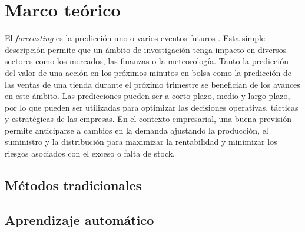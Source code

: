 \chapter{Marco teórico}\label{cap2}

El \textit{forecasting} es la predicción uno o varios eventos futuros \cite{intro}. Esta simple descripción permite que un ámbito de investigación tenga impacto en diversos sectores como los mercados, las finanzas o la meteorología. Tanto la predicción del valor de una acción en los próximos minutos en bolsa como la predicción de las ventas de una tienda durante el próximo trimestre se benefician de los avances en este ámbito. Las predicciones pueden ser a corto plazo, medio y largo plazo, por lo que pueden ser utilizadas para optimizar las decisiones operativas, tácticas y estratégicas de las empresas. En el contexto empresarial, una buena previsión permite anticiparse a cambios en la demanda ajustando la producción, el suministro y la distribución para maximizar la rentabilidad y minimizar los riesgos asociados con el exceso o falta de stock. 

\section{Métodos tradicionales}

\section{Aprendizaje automático}
